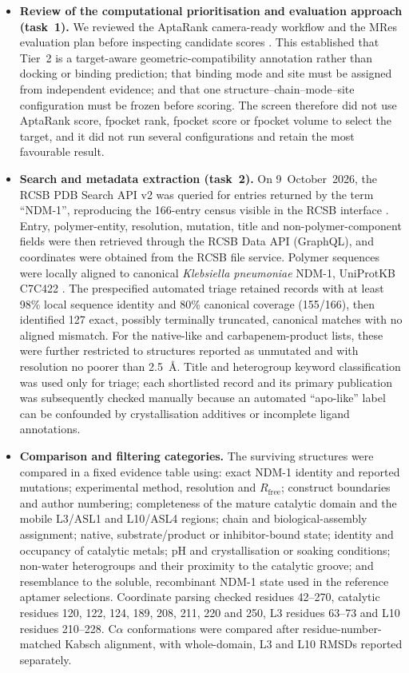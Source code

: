 \begin{itemize}
  \item \textbf{Review of the computational prioritisation and evaluation
  approach (task~1).}  We reviewed the AptaRank camera-ready workflow and the
  MRes evaluation plan before inspecting candidate scores
  \cite{hardy_aptarank_2026}.  This established that Tier~2 is a target-aware
  geometric-compatibility annotation rather than docking or binding
  prediction; that binding mode and site must be assigned from independent
  evidence; and that one structure--chain--mode--site configuration must be
  frozen before scoring.  The screen therefore did not use AptaRank score,
  fpocket rank, fpocket score or fpocket volume to select the target, and it did
  not run several configurations and retain the most favourable result.

  \item \textbf{Search and metadata extraction (task~2).}  On 9~October~2026,
  the RCSB PDB Search API v2 was queried for entries returned by the term
  ``NDM-1'', reproducing the 166-entry census visible in the RCSB interface
  \cite{berman_protein_2000}.  Entry, polymer-entity, resolution, mutation,
  title and non-polymer-component fields were then retrieved through the RCSB
  Data API (GraphQL), and coordinates were obtained from the RCSB file service.
  Polymer sequences were locally aligned to canonical \textit{Klebsiella
  pneumoniae} NDM-1, UniProtKB C7C422
  \cite{uniprot_consortium_uniprot_2025}.  The prespecified automated triage
  retained records with at least 98\% local sequence identity and 80\%
  canonical coverage (155/166), then identified 127 exact, possibly
  terminally truncated, canonical matches with no aligned mismatch.  For the
  native-like and carbapenem-product lists, these were further restricted to
  structures reported as unmutated and with resolution no poorer than
  2.5~\AA{}.  Title and heterogroup keyword classification was used only for
  triage; each shortlisted record and its primary publication was subsequently
  checked manually because an automated ``apo-like'' label can be confounded
  by crystallisation additives or incomplete ligand annotations.

  \item \textbf{Comparison and filtering categories.}  The surviving
  structures were compared in a fixed evidence table using: exact NDM-1
  identity and reported mutations; experimental method, resolution and
  $R_{\mathrm{free}}$; construct boundaries and author numbering; completeness
  of the mature catalytic domain and the mobile L3/ASL1 and L10/ASL4 regions;
  chain and biological-assembly assignment; native, substrate/product or
  inhibitor-bound state; identity and occupancy of catalytic metals; pH and
  crystallisation or soaking conditions; non-water heterogroups and their
  proximity to the catalytic groove; and resemblance to the soluble,
  recombinant NDM-1 state used in the reference aptamer selections.  Coordinate
  parsing checked residues 42--270, catalytic residues 120, 122, 124, 189,
  208, 211, 220 and 250, L3 residues 63--73 and L10 residues 210--228.
  C$\alpha$ conformations were compared after residue-number-matched Kabsch
  alignment, with whole-domain, L3 and L10 RMSDs reported separately.


\end{itemize}
